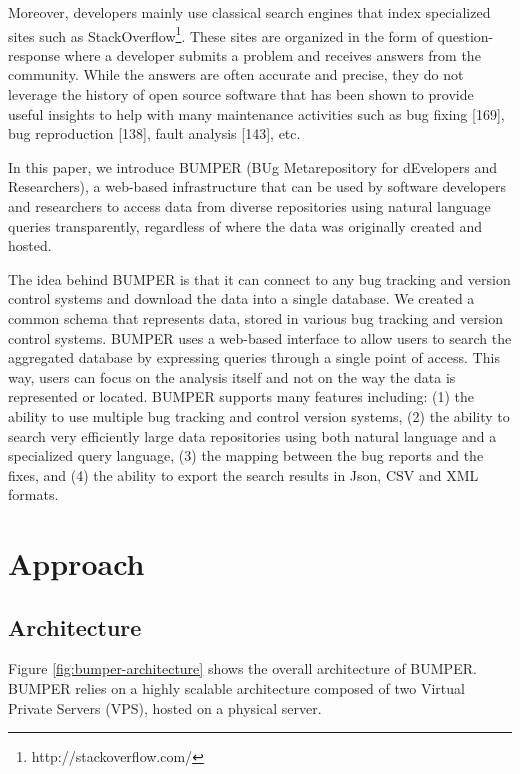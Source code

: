 \documentclass[12pt]{report}
\begin{document}
Moreover, developers mainly use classical search engines that index
specialized sites such as
StackOverflow\footnote{http://stackoverflow.com/}. These sites are
organized in the form of question-response where a developer submits a
problem and receives answers from the community. While the answers are
often accurate and precise, they do not leverage the history of open
source software that has been shown to provide useful insights to help
with many maintenance activities such as bug fixing {[}169{]}, bug
reproduction {[}138{]}, fault analysis {[}143{]}, etc.

In this paper, we introduce BUMPER (BUg Metarepository for dEvelopers
and Researchers), a web-based infrastructure that can be used by
software developers and researchers to access data from diverse
repositories using natural language queries transparently, regardless of
where the data was originally created and hosted.

The idea behind BUMPER is that it can connect to any bug tracking and
version control systems and download the data into a single database. We
created a common schema that represents data, stored in various bug
tracking and version control systems. BUMPER uses a web-based interface
to allow users to search the aggregated database by expressing queries
through a single point of access. This way, users can focus on the
analysis itself and not on the way the data is represented or located.
BUMPER supports many features including: (1) the ability to use multiple
bug tracking and control version systems, (2) the ability to search very
efficiently large data repositories using both natural language and a
specialized query language, (3) the mapping between the bug reports and
the fixes, and (4) the ability to export the search results in Json, CSV
and XML formats.

\section{Approach}\label{approach}

\subsection{Architecture}\label{architecture}

Figure \ref{fig:bumper-architecture} shows the overall architecture of
BUMPER. BUMPER relies on a highly scalable architecture composed of two
Virtual Private Servers (VPS), hosted on a physical server.
\end{document}
